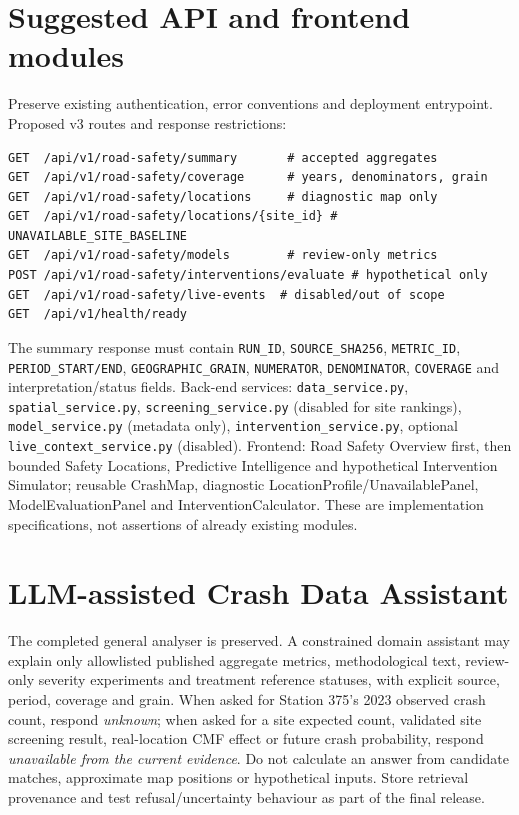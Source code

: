 \documentclass[11pt,a4paper,openany]{report}
\newcommand{\pathcode}[1]{\nolinkurl{#1}}
\begin{document}
\section{Suggested API and frontend modules}
Preserve existing authentication, error conventions and deployment entrypoint. Proposed v3 routes and response restrictions:
\begin{lstlisting}
GET  /api/v1/road-safety/summary       # accepted aggregates
GET  /api/v1/road-safety/coverage      # years, denominators, grain
GET  /api/v1/road-safety/locations     # diagnostic map only
GET  /api/v1/road-safety/locations/{site_id} # UNAVAILABLE_SITE_BASELINE
GET  /api/v1/road-safety/models        # review-only metrics
POST /api/v1/road-safety/interventions/evaluate # hypothetical only
GET  /api/v1/road-safety/live-events  # disabled/out of scope
GET  /api/v1/health/ready
\end{lstlisting}
The summary response must contain \pathcode{RUN_ID}, \pathcode{SOURCE_SHA256}, \pathcode{METRIC_ID}, \pathcode{PERIOD_START/END}, \pathcode{GEOGRAPHIC_GRAIN}, \pathcode{NUMERATOR}, \pathcode{DENOMINATOR}, \pathcode{COVERAGE} and interpretation/status fields. Back-end services: \pathcode{data_service.py}, \pathcode{spatial_service.py}, \pathcode{screening_service.py} (disabled for site rankings), \pathcode{model_service.py} (metadata only), \pathcode{intervention_service.py}, optional \pathcode{live_context_service.py} (disabled). Frontend: Road Safety Overview first, then bounded Safety Locations, Predictive Intelligence and hypothetical Intervention Simulator; reusable CrashMap, diagnostic LocationProfile/UnavailablePanel, ModelEvaluationPanel and InterventionCalculator. These are implementation specifications, not assertions of already existing modules.

\section{LLM-assisted Crash Data Assistant}
The completed general analyser is preserved. A constrained domain assistant may explain only allowlisted published aggregate metrics, methodological text, review-only severity experiments and treatment reference statuses, with explicit source, period, coverage and grain. When asked for Station 375's 2023 observed crash count, respond \emph{unknown}; when asked for a site expected count, validated site screening result, real-location CMF effect or future crash probability, respond \emph{unavailable from the current evidence}. Do not calculate an answer from candidate matches, approximate map positions or hypothetical inputs. Store retrieval provenance and test refusal/uncertainty behaviour as part of the final release.
\end{document}
